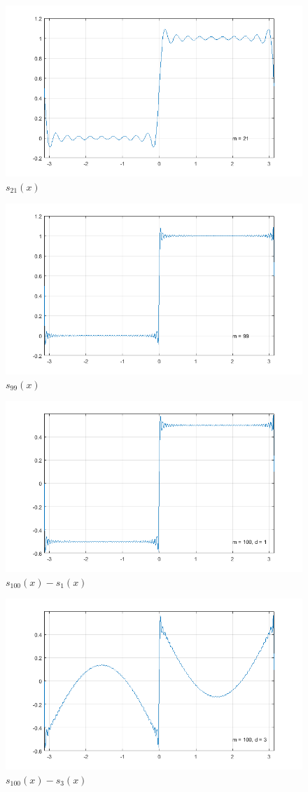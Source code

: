 \begin{figure}[H]
	\centering
	\includegraphics[width=0.5\linewidth]{AfanasyevMM/img/s(x)_m21}
	\caption{$s_{21}(x)$}
	\label{fig:AfanasyevMM.s(x)_m21}
\end{figure}
\begin{figure}[H]
	\centering
	\includegraphics[width=0.5\linewidth]{AfanasyevMM/img/s(x)_m99}
	\caption{$s_{99}(x)$}
	\label{fig:AfanasyevMM.s(x)_m99}
\end{figure}
\begin{figure}[H]
	\centering
	\includegraphics[width=0.5\linewidth]{AfanasyevMM/img/s(x)_m100_d1}
	\caption{$s_{100}(x) - s_{1}(x)$}
	\label{fig:AfanasyevMM.s(x)_m100_d1}
\end{figure}
\begin{figure}[H]
	\centering
	\includegraphics[width=0.5\linewidth]{AfanasyevMM/img/s(x)_m100_d3}
	\caption{$s_{100}(x) - s_{3}(x)$}
	\label{fig:AfanasyevMM.s(x)_m100_d3}
\end{figure}
